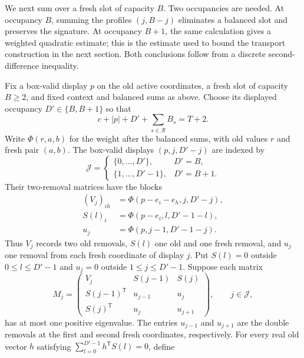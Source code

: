 We next sum over a fresh slot of capacity $B$.  Two occupancies are
needed.  At occupancy $B$, summing the profiles $(j,B-j)$ eliminates a
balanced slot and preserves the signature.  At occupancy $B+1$, the
same calculation gives a weighted quadratic estimate; this is the
estimate used to bound the transport construction in the next section.
Both conclusions follow from a discrete second-difference inequality.

\begin{lemma}\label{lem:pair-summation}
Fix a box-valid display $p$ on the old active coordinates, a fresh slot
of capacity $B\ge2$, and fixed context and balanced sums as above.
Choose its displayed occupancy $D'\in\{B,B+1\}$ so that
\begin{equation}\label{eq:pair-total}
 c+|p|+D'+\sum_{s\in\mathcal R}B_s=T+2.
\end{equation}
Write $\Phi(r,a,b)$ for the weight after the balanced sums, with old
values $r$ and fresh pair $(a,b)$.  The box-valid displays
$(p,j,D'-j)$ are indexed by
\[
 \mathcal J=
 \begin{cases}
 \{0,\ldots,D'\},&D'=B,\\
 \{1,\ldots,D'-1\},&D'=B+1.
 \end{cases}
\]
Their two-removal matrices have the blocks
\begin{align*}
 (V_j)_{ih}&=\Phi(p-e_i-e_h,j,D'-j),\\
 S(l)_i&=\Phi(p-e_i,l,D'-1-l),\\
 u_j&=\Phi(p,j-1,D'-1-j).
\end{align*}
Thus $V_j$ records two old removals, $S(l)$ one old and one fresh
removal, and $u_j$ one removal from each fresh coordinate of display
$j$.  Put $S(l)=0$ outside
$0\le l\le D'-1$ and $u_j=0$ outside $1\le j\le D'-1$.
Suppose each matrix
\begin{equation}\label{eq:pair-block}
 M_j=\begin{pmatrix}
 V_j&S(j-1)&S(j)\\
 S(j-1)^{\mathsf T}&u_{j-1}&u_j\\
 S(j)^{\mathsf T}&u_j&u_{j+1}
 \end{pmatrix},\qquad j\in\mathcal J,
\end{equation}
has at most one positive eigenvalue.  The entries $u_{j-1}$ and
$u_{j+1}$ are the double removals at the first and second fresh
coordinates, respectively.
For every real old vector $h$ satisfying
$\sum_{l=0}^{D'-1}h^{\mathsf T}S(l)=0$, define
\begin{equation}\label{eq:pair-cumulative}

\end{equation}
\end{lemma}
